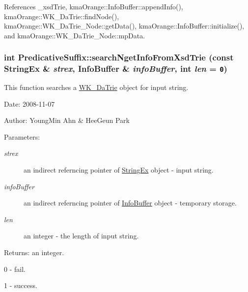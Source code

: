 References \_\-xsdTrie, kmaOrange::InfoBuffer::appendInfo(), kmaOrange::WK\_\-DaTrie::findNode(), kmaOrange::WK\_\-DaTrie\_\-Node::getData(), kmaOrange::InfoBuffer::initialize(), and kmaOrange::WK\_\-DaTrie\_\-Node::mpData.\hypertarget{classkmaOrange_1_1PredicativeSuffix_16b885b95dc15ec586a99aa65c74938d}{
\subsubsection[{searchNgetInfoFromXsdTrie}]{\setlength{\rightskip}{0pt plus 5cm}int PredicativeSuffix::searchNgetInfoFromXsdTrie (const {\bf StringEx} \& {\em strex}, \/  {\bf InfoBuffer} \& {\em infoBuffer}, \/  int {\em len} = {\tt 0})}}
\label{classkmaOrange_1_1PredicativeSuffix_16b885b95dc15ec586a99aa65c74938d}


This function searches a \hyperlink{classkmaOrange_1_1WK__DaTrie}{WK\_\-DaTrie} object for input string. 

\begin{Desc}
\item[Date:]2008-11-07 \end{Desc}
\begin{Desc}
\item[Author:]YoungMin Ahn \& HeeGeun Park \end{Desc}
\begin{Desc}
\item[Parameters:]
\begin{description}
\item[{\em strex}]an indirect referncing pointer of \hyperlink{classStringEx}{StringEx} object - input string. \item[{\em infoBuffer}]an indirect referncing pointer of \hyperlink{classkmaOrange_1_1InfoBuffer}{InfoBuffer} object - temporary storage. \item[{\em len}]an integer - the length of input string. \end{description}
\end{Desc}
\begin{Desc}
\item[Returns:]an integer.\par
 0 - fail.\par
 1 - success. \end{Desc}


